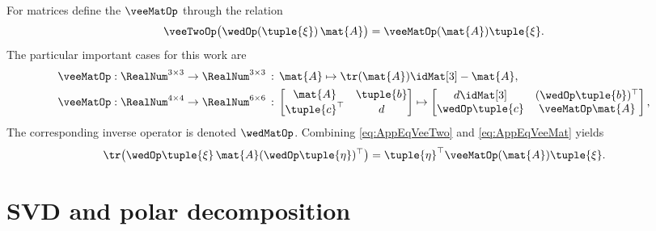 For matrices define the $\veeMatOp$ through the relation
\begin{align}\label{eq:AppEqVeeMat}
 \veeTwoOp\big(\wedOp(\tuple{\xi}) \, \mat{A} \big) = \veeMatOp(\mat{A}) \tuple{\xi}.
\end{align}
The particular important cases for this work are
\begin{subequations}\label{eq:AppDefVeeMat}
\begin{align}
 \veeMatOp &: \RealNum^{3\times 3} \rightarrow \RealNum^{3\times 3} \, : \, \mat{A} \mapsto \tr(\mat{A}) \idMat[3] - \mat{A},
\\
 \veeMatOp &: \RealNum^{4\times 4} \rightarrow \RealNum^{6\times 6} \, : \, \begin{bmatrix} \mat{A} & \tuple{b} \\ \tuple{c}^\top & d \end{bmatrix} \mapsto \begin{bmatrix} d \idMat[3] & (\wedOp \tuple{b})^\top \\ \wedOp\tuple{c} & \veeMatOp\mat{A} \end{bmatrix},
\end{align} 
\end{subequations}
The corresponding inverse operator is denoted $\wedMatOp$.
Combining \eqref{eq:AppEqVeeTwo} and \eqref{eq:AppEqVeeMat} yields
\begin{align}
 \tr\big( \wedOp\tuple{\xi}\, \mat{A} (\wedOp\tuple{\eta})^\top \big) = \tuple{\eta}^\top \veeMatOp(\mat{A}) \tuple{\xi}.
\end{align}

\section{SVD and polar decomposition}
